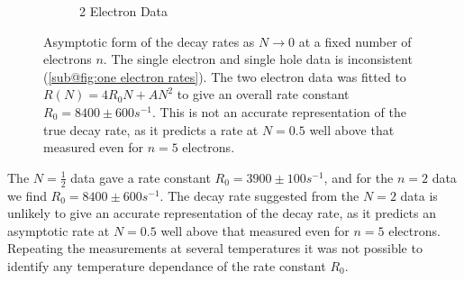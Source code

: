 \begin{figure}[htbp]
\begin{subfigure}{0.45\linewidth}
        \caption{2 Electron Data
        }\label{sub@fig:two electron rates}
    \end{subfigure}
    \caption{Asymptotic
        form of the decay rates as \(N\rightarrow{}0\)
        at a fixed number of electrons \(n\).
        The single electron and single
        hole data is inconsistent
        (\cref{sub@fig:one electron rates}).
        The two electron data
        was fitted to \(R(N) = 4R_0N + AN^2\)
        to give an overall rate constant
        \(R_0 = 8400\pm 600s^{-1}\). This is
        not an accurate
        representation of the
        true decay rate, as it predicts
        a rate at \(N=0.5\)
        well above that measured even
        for \(n=5\) electrons.
    }\label{fig:small N rate}
\end{figure}
The \(N=\frac{1}{2}\) data
gave a rate constant
\(R_0 = 3900\pm 100s^{-1}\),
and for the \(n=2\) data
we find \(R_0 = 8400\pm 600s^{-1}\).
The decay rate suggested
from the \(N=2\) data is
unlikely to give an accurate
representation of the
decay rate, as it predicts
an asymptotic rate at \(N=0.5\)
well above that measured even
for \(n=5\) electrons.
Repeating the measurements at several
temperatures it was not possible
to identify any
temperature dependance of the
rate constant \(R_0\).

